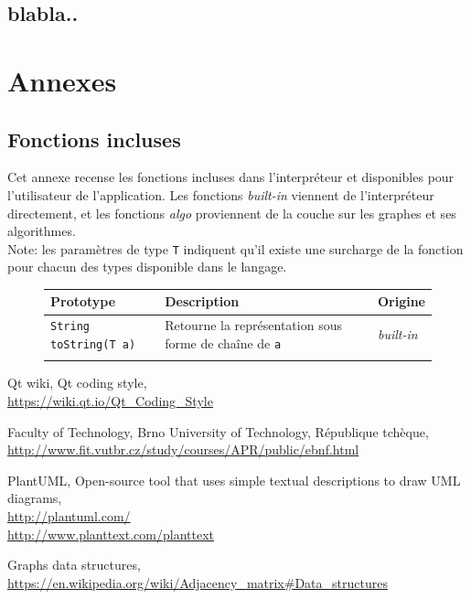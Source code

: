 \documentclass[french]{article}
\begin{document}
		\subsection{blabla..}
	
	\section{Annexes}
	
		\subsection{Fonctions incluses}
			\label{subsec:annexes-fonctions-incluses}
			Cet annexe recense les fonctions incluses dans l'interpréteur et disponibles pour l'utilisateur de l'application. Les fonctions \textit{built-in} viennent de l'interpréteur directement, et les fonctions \textit{algo} proviennent de la couche sur les graphes et ses algorithmes.\\
			
			Note: les paramètres de type \texttt{T} indiquent qu'il existe une surcharge de la fonction pour chacun des types disponible dans le langage.
			
			\begin{figure}[H]
				\centering
				\begin{tabular}{lll}
					Prototype & Description & Origine\\
					\hline
					\texttt{String toString(T a)} & Retourne la représentation sous forme de chaîne de \texttt{a} & \textit{built-in}\\
					\texttt{} & & \textit{}\\
				\end{tabular}
			\end{figure}
	
	\begin{thebibliography}{9}
		Qt wiki, Qt coding style,\\ \url{https://wiki.qt.io/Qt_Coding_Style}
		
		Faculty of Technology, Brno University of Technology, République tchèque,\\ \url{http://www.fit.vutbr.cz/study/courses/APR/public/ebnf.html}
		
		PlantUML, Open-source tool that uses simple textual descriptions to draw UML diagrams,\\ \url{http://plantuml.com/}\\ \url{http://www.planttext.com/planttext}

		Graphs data structures,\\ \url{https://en.wikipedia.org/wiki/Adjacency_matrix#Data_structures}
	\end{thebibliography}			
\end{document}
